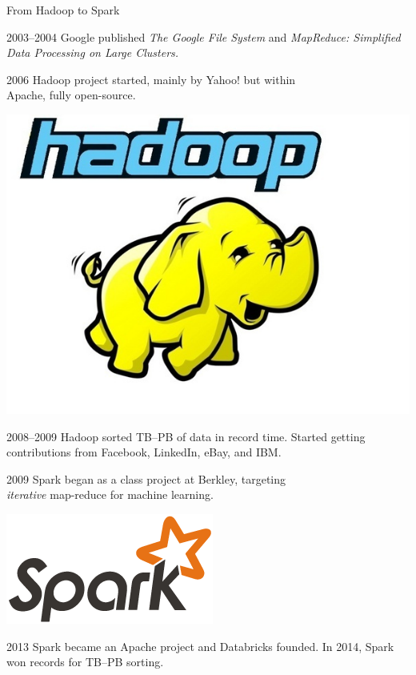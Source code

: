 \documentclass{beamer}
\begin{document}
\begin{frame}{From Hadoop to Spark}
\begin{block}{2003--2004}
Google published {\it The Google File System} and {\it MapReduce: Simplified Data Processing on Large Clusters.}
\end{block}

\begin{block}{2006}
Hadoop project started, mainly by Yahoo! but within \\ Apache, fully open-source.

\vspace{-1.4 cm} \hfill \includegraphics[width=2 cm]{01_Hadoop_full.jpg}
\end{block}

\begin{block}{2008--2009}
Hadoop sorted TB--PB of data in record time. Started getting contributions from Facebook, LinkedIn, eBay, and IBM.
\end{block}

\begin{block}{2009}
Spark began as a class project at Berkley, targeting \\ {\it iterative} map-reduce for machine learning.

\vspace{-1.1 cm} \hfill \includegraphics[width=2 cm]{spark-logo.png}
\end{block}

\begin{block}{2013}
Spark became an Apache project and Databricks founded. In 2014, Spark won records for TB--PB sorting.
\end{block}
\end{frame}
\end{document}
